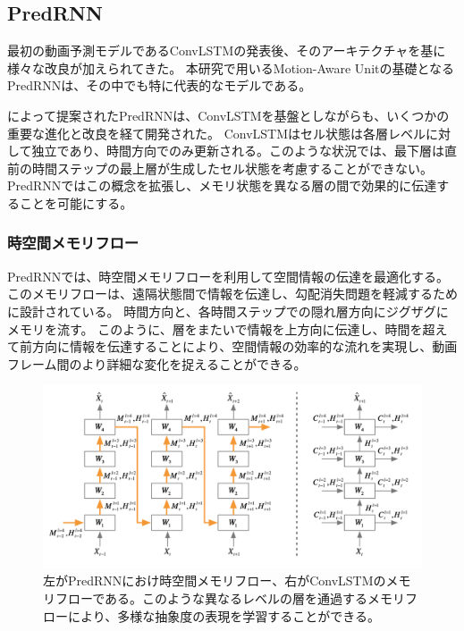     \subsection{PredRNN}
      最初の動画予測モデルであるConvLSTMの発表後、そのアーキテクチャを基に様々な改良が加えられてきた。
      本研究で用いるMotion-Aware Unitの基礎となるPredRNNは、その中でも特に代表的なモデルである。

      によって提案されたPredRNNは、ConvLSTMを基盤としながらも、いくつかの重要な進化と改良を経て開発された。
      ConvLSTMはセル状態は各層レベルに対して独立であり、時間方向でのみ更新される。このような状況では、最下層は直前の時間ステップの最上層が生成したセル状態を考慮することができない。
      PredRNNではこの概念を拡張し、メモリ状態を異なる層の間で効果的に伝達することを可能にする。
        
      \subsubsection{時空間メモリフロー}
        PredRNNでは、時空間メモリフローを利用して空間情報の伝達を最適化する。このメモリフローは、遠隔状態間で情報を伝達し、勾配消失問題を軽減するために設計されている。
        時間方向と、各時間ステップでの隠れ層方向にジグザグにメモリを流す。
        このように、層をまたいで情報を上方向に伝達し、時間を超えて前方向に情報を伝達することにより、空間情報の効率的な流れを実現し、動画フレーム間のより詳細な変化を捉えることができる。
        \begin{figure}[htbp]
          \begin{center}
            \includegraphics[width=\textwidth]{figures/videoprediction/predrnn_memory.png}
            \caption{左がPredRNNにおけ時空間メモリフロー、右がConvLSTMのメモリフローである。このような異なるレベルの層を通過するメモリフローにより、多様な抽象度の表現を学習することができる。}
            \label{fig:predrnn}
          \end{center}
        \end{figure}
        
